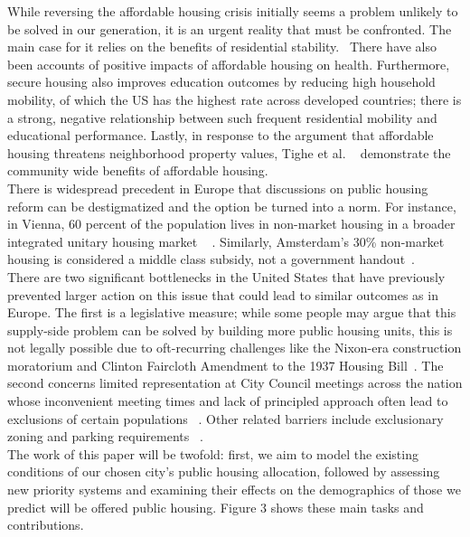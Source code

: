 \documentclass[11pt]{article}
\begin{document}
 \newline
While reversing the affordable housing crisis initially seems a problem unlikely to be solved in our generation, it is an urgent reality that must be confronted. The main case for it relies on the benefits of residential stability.~\cite{maqbool_insightsfromhousing_nodate} There have also been accounts of positive impacts of affordable housing on health. Furthermore, secure housing also improves education outcomes by reducing high household mobility, of which the US has the highest rate across developed countries; there is a strong, negative relationship between such frequent residential mobility and educational performance. Lastly, in response to the argument that affordable housing threatens neighborhood property values, Tighe et al. ~\cite{tighe_affordable_2012}  demonstrate the community wide benefits of affordable housing.\\
\newline
There is widespread precedent in Europe that discussions on public housing reform can be destigmatized and the option be turned into a norm. For instance, in Vienna, 60 percent of the population lives in non-market housing in a broader integrated unitary housing market ~\cite{marquardt_how_2020} . Similarly, Amsterdam's 30\% non-market housing is considered a middle class subsidy, not a government handout~\cite{hanneke_van_deursen_peoples_2023}.\\
\newline
There are two significant bottlenecks in the United States that have previously prevented larger action on this issue that could lead to similar outcomes as in Europe. The first is a legislative measure; while some people may argue that this supply-side problem can be solved by building more public housing units, this is not legally possible due to oft-recurring challenges like the Nixon-era construction moratorium and Clinton Faircloth Amendment to the 1937 Housing Bill~\cite{hud_guidance_nodate}. The second concerns limited representation at City Council meetings across the nation whose inconvenient meeting times and lack of principled approach often lead to exclusions of certain populations ~\cite{mcnee_nimbyism_2022}. Other related barriers include exclusionary zoning and parking requirements~\cite{jenna_davis_double-edged_2021} .\\
\newline
The work of this paper will be twofold: first, we aim to model the existing conditions of our chosen city's public housing allocation, followed by assessing new priority systems and examining their effects on the demographics of those we predict will be offered public housing. Figure 3 shows these main tasks and contributions.\\
\end{document}
